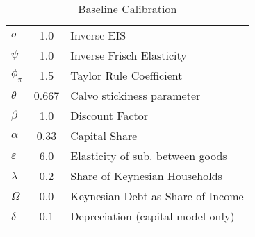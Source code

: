   \begin{table}
\begin{center}
    \caption{Baseline Calibration}\label{table:calibration}
\begin{tabular}{lcl}  
\\ \toprule  
$\sigma$ & 1.0 & Inverse EIS \\ 
$\psi$ & 1.0 & Inverse Frisch Elasticity \\ 
$\phi_{\pi}$ & 1.5 & Taylor Rule Coefficient \\ 
$\theta$ & 0.667 & Calvo stickiness parameter \\ 
$\beta$ & 1.0 &  Discount Factor\\ 
$\alpha$ & 0.33 &  Capital Share \\ 
$\varepsilon$ & 6.0 &  Elasticity of sub. between goods\\ 
$\lambda$ & 0.2 & Share of Keynesian Households \\ 
$\Omega$ & 0.0 & Keynesian Debt as Share of Income \\ 
$\delta$ & 0.1 & Depreciation (capital model only) \\ 
\\ \bottomrule 
 \end{tabular}
\end{center}
\end{table}
